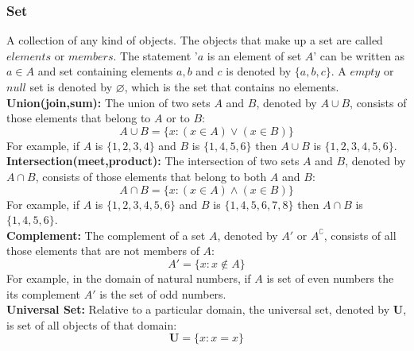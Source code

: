 \documentclass[12pt]{article}
\begin{document}
\subsubsection{Set}
 A collection of any kind of objects. The objects that make  up a set are called $elements$ or $members$. The statement '$a$ is an element of set $A$' can be written as $a \in A$ and set containing elements $a,b$ and $c$ is denoted by $\{a,b,c\}$. A $empty$  or $null$ set is denoted by  $\varnothing$, which is the set that contains no elements.\\
\textbf{Union(join,sum):} The union of two sets $A$ and $B$, denoted by $A \cup B$, consists of those elements that belong to $A$ or to $B$: $$A \cup B = \{x:(x \in A) \lor (x \in B)\}$$ For example, if $A$ is $\{1,2,3,4\}$ and $B$ is $\{1,4,5,6\}$ then $A \cup B$  is $\{1,2,3,4,5,6\}$.\\
\textbf{Intersection(meet,product):} The intersection of two sets $A$ and $B$, denoted by $A \cap B$, consists of those elements that belong to both $A$ and $B$: $$A \cap B=\{x:(x \in A) \land (x \in B)\}$$ For example, if $A$ is $\{1,2,3,4,5,6\}$ and $B$ is $\{1,4,5,6,7,8\}$ then $A \cap B$ is $\{1,4,5,6\}$.\\
\textbf{Complement:} The complement of a set $A$, denoted by $A'$ or $A^{\complement}$, consists of all those elements that are not members of $A$: $$A'=\{x:x \not \in A\}$$ For example, in the domain of natural numbers, if $A$ is set of even numbers the its complement $A'$ is the set of odd numbers.\\
\textbf{Universal Set:} Relative to a particular domain, the universal set, denoted by $\mathbf{U}$, is set of all objects of that domain:
$$\mathbf{U}=\{x:x=x\}$$
\end{document}
